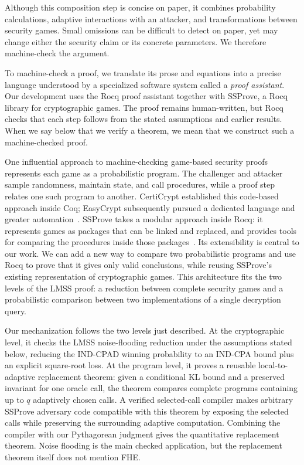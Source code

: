 Although this composition step is concise on paper, it combines probability
calculations, adaptive interactions with an attacker, and transformations
between security games.
Small omissions can be difficult to detect on paper, yet may change either the
security claim or its concrete parameters.
We therefore machine-check the argument.

To machine-check a proof, we translate its prose and equations into a precise
language understood by a specialized software system called a \emph{proof
assistant}.
Our development uses the Rocq proof assistant together with SSProve, a Rocq
library for cryptographic games.
The proof remains human-written, but Rocq checks that each step follows from the
stated assumptions and earlier results.
When we say below that we verify a theorem, we mean that we construct such a
machine-checked proof.

One influential approach to machine-checking game-based security proofs
represents each game as a probabilistic program.
The challenger and attacker sample randomness, maintain state, and call
procedures, while a proof step relates one such program to another.
CertiCrypt established this code-based approach inside Coq; EasyCrypt
subsequently pursued a dedicated language and greater
automation~\cite{certicrypt,easycrypt}.
SSProve takes a modular approach inside Rocq: it represents games as packages
that can be linked and replaced, and provides tools for comparing the procedures
inside those packages~\cite{ssprove}.
Its extensibility is central to our work.
We can add a new way to compare two probabilistic programs and use Rocq to prove
that it gives only valid conclusions, while reusing SSProve's existing
representation of cryptographic games.
This architecture fits the two levels of the LMSS proof: a reduction between
complete security games and a probabilistic comparison between two
implementations of a single decryption query.

Our mechanization follows the two levels just described.
At the cryptographic level, it checks the LMSS noise-flooding reduction under
the assumptions stated below, reducing the IND-CPAD winning probability to an
IND-CPA bound plus an explicit square-root loss.
At the program level, it proves a reusable local-to-adaptive replacement
theorem: given a conditional KL bound and a preserved invariant for one oracle
call, the theorem compares complete programs containing up to \(q\) adaptively
chosen calls.
A verified selected-call compiler makes arbitrary SSProve adversary code
compatible with this theorem by exposing the selected calls while preserving
the surrounding adaptive computation.  Combining the compiler with our
Pythagorean judgment gives the quantitative replacement theorem.
Noise flooding is the main checked application, but the replacement theorem
itself does not mention FHE.

